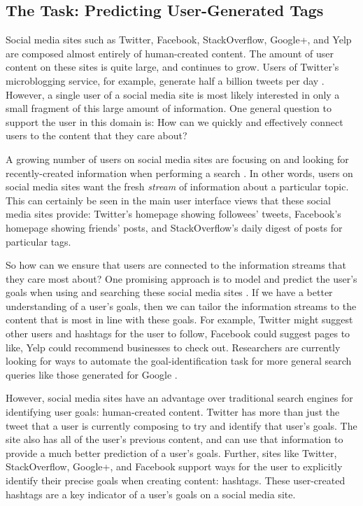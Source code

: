 \documentclass[man,floatsintext,donotrepeattitle]{apa6}
\begin{document}
\subsection{The Task: Predicting User-Generated Tags}

Social media sites such as Twitter, Facebook, StackOverflow, Google+, and Yelp are composed almost entirely of human-created content.
The amount of user content on these sites is quite large, and continues to grow.
Users of Twitter's microblogging service, for example, generate half a billion tweets per day \parencite{TwitterReport2012}.
However, a single user of a social media site is most likely interested in only a small fragment of this large amount of information.
One general question to support the user in this domain is:
How can we quickly and effectively connect users to the content that they care about?

A growing number of users on social media sites are focusing on and looking for recently-created information when performing a search \parencite{Jansen2011}.
In other words, users on social media sites want the fresh \emph{stream} of information about a particular topic.
This can certainly be seen in the main user interface views that these social media sites provide:
Twitter's homepage showing followees' tweets, Facebook's homepage showing friends' posts, and StackOverflow's daily digest of posts for particular tags.

So how can we ensure that users are connected to the information streams that they care most about?
One promising approach is to model and predict the user's goals when using and searching these social media sites \parencite{Rose2004}.
If we have a better understanding of a user's goals, then we can tailor the information streams to the content that is most in line with these goals.
For example, Twitter might suggest other users and hashtags for the user to follow, Facebook could suggest pages to like, Yelp could recommend businesses to check out.
Researchers are currently looking for ways to automate the goal-identification task for more general search queries like those generated for Google \parencites{Jansen2008}{Lee2005}.

However, social media sites have an advantage over traditional search engines for identifying user goals: human-created content.
Twitter has more than just the tweet that a user is currently composing to try and identify that user's goals.
The site also has all of the user's previous content, and can use that information to provide a much better prediction of a user's goals.
Further, sites like Twitter, StackOverflow, Google+, and Facebook support ways for the user to explicitly identify their precise goals when creating content: hashtags.
These user-created hashtags are a key indicator of a user's goals on a social media site. 
\end{document}
